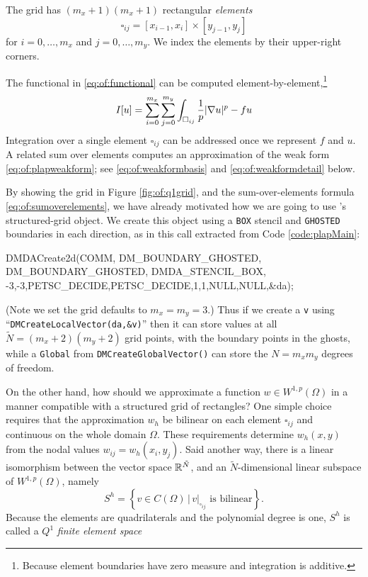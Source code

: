 The grid has $(m_x+1)(m_x+1)$ rectangular \emph{elements}
   $$\square_{ij} = [x_{i-1},x_i] \times [y_{j-1},y_j]$$
for $i=0,\dots,m_x$ and $j=0,\dots,m_y$.  We index the elements by their upper-right corners.

The functional in \eqref{eq:of:functional} can be computed element-by-element,\footnote{Because element boundaries have zero measure and integration is additive.}
\begin{equation}
I[u] = \sum_{i=0}^{m_x} \sum_{j=0}^{m_y} \int_{\square_{ij}} \frac{1}{p} |\nabla u|^p - fu  \label{eq:of:sumoverelements}
\end{equation}
Integration over a single element $\square_{ij}$ can be addressed once we represent $f$ and $u$.  A related sum over elements computes an approximation of the weak form \eqref{eq:of:plapweakform}; see \eqref{eq:of:weakformbasis} and \eqref{eq:of:weakformdetail} below.

By showing the grid in Figure \ref{fig:of:q1grid}, and the sum-over-elements formula \eqref{eq:of:sumoverelements}, we have already motivated how we are going to use \PETSc's \pDMDA structured-grid object.  We create this object using a \texttt{BOX} stencil and \texttt{GHOSTED} boundaries in each direction, as in this call extracted from Code \ref{code:plapMain}:
\begin{code}
  DMDACreate2d(COMM,
      DM_BOUNDARY_GHOSTED, DM_BOUNDARY_GHOSTED, DMDA_STENCIL_BOX,
      -3,-3,PETSC_DECIDE,PETSC_DECIDE,1,1,NULL,NULL,&da);
\end{code}
(Note we set the grid defaults to $m_x=m_y=3$.)  Thus if we create a \pVec \texttt{v} using ``\texttt{DMCreateLocalVector(da,\&v)}'' then it can store values at all $\tilde N = (m_x+2)(m_y+2)$ grid points, with the boundary points in the ghosts, while a \texttt{Global} \pVec from \texttt{DMCreateGlobalVector()} can store the $N=m_x m_y$ degrees of freedom.

On the other hand, how should we approximate a function $w \in W^{1,p}(\Omega)$ in a manner compatible with a structured grid of rectangles?  One simple choice requires that the approximation $w_h$ be bilinear on each element $\square_{ij}$ and continuous on the whole domain $\Omega$.  These requirements determine $w_h(x,y)$ from the nodal values $w_{ij} = w_h(x_i,y_j)$.  Said another way, there is a linear isomorphism between the vector space $\mathbb{R}^{\tilde N}$, and an $\tilde N$-dimensional linear subspace of $W^{1,p}(\Omega)$, namely
\begin{equation}
S^h = \left\{v \in C(\Omega) \, \Big| \, v|_{\square_{ij}} \text{ is bilinear}\right\}. \label{eq:of:Shdefn}
\end{equation}
Because the elements are quadrilaterals and the polynomial degree is one, $S^h$ is called a $Q^1$ \emph{finite element space} \citep{Elmanetal2005}

